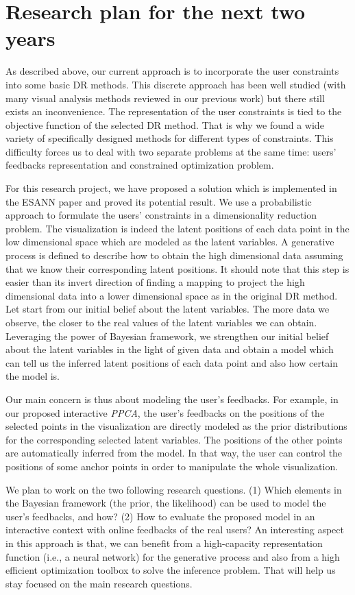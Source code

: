 \documentclass[11pt, a4paper]{article}
\begin{document}
\section{Research plan for the next two years}\label{sec:work}
As described above, our current approach is to incorporate the user constraints into some basic DR methods.
This discrete approach has been well studied (with many visual analysis methods reviewed in our previous work) but there still exists an inconvenience.
The representation of the user constraints is tied to the objective function of the selected DR method.
That is why we found a wide variety of specifically designed methods for different types of constraints.
This difficulty forces us to deal with two separate problems at the same time: users' feedbacks representation and constrained optimization problem.

For this research project, we have proposed a solution which is implemented in the ESANN paper and proved its potential result.
We use a probabilistic approach to formulate the users' constraints in a dimensionality reduction problem.
The visualization is indeed the latent positions of each data point in the low dimensional space which are modeled as the latent variables.
A generative process is defined to describe how to obtain the high dimensional data assuming that we know their corresponding latent positions.
It should note that this step is easier than its invert direction of finding a mapping to project the high dimensional data into a lower dimensional space as in the original DR method.
Let start from our initial belief about the latent variables.
The more data we observe, the closer to the real values of the latent variables we can obtain.
Leveraging the power of Bayesian framework, we strengthen our initial belief about the latent variables in the light of given data and obtain a model which can tell us the inferred latent positions of each data point and also how certain the model is.

Our main concern is thus about modeling the user's feedbacks.
For example, in our proposed interactive \emph{PPCA}, the user's feedbacks on the positions of the selected points in the visualization are directly modeled as the prior distributions for the corresponding selected latent variables.
The positions of the other points are automatically inferred from the model.
In that way, the user can control the positions of some anchor points in order to manipulate the whole visualization.

We plan to work on the two following research questions.
(1) Which elements in the Bayesian framework (the prior, the likelihood) can be used to model the user's feedbacks, and how?
(2) How to evaluate the proposed model in an interactive context with online feedbacks of the real users?
An interesting aspect in this approach is that, we can benefit from a high-capacity representation function (i.e., a neural network) for the generative process and also from a high efficient optimization toolbox to solve the inference problem.
That will help us stay focused on the main research questions.
\end{document}
